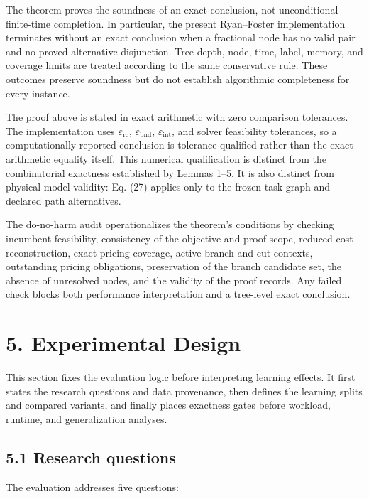 \documentclass[
  11pt,
]{article}
\begin{document}
The theorem proves the soundness of an exact conclusion, not
unconditional finite-time completion. In particular, the present
Ryan--Foster implementation terminates without an exact conclusion when
a fractional node has no valid pair and no proved alternative
disjunction. Tree-depth, node, time, label, memory, and coverage limits
are treated according to the same conservative rule. These outcomes
preserve soundness but do not establish algorithmic completeness for
every instance.

The proof above is stated in exact arithmetic with zero comparison
tolerances. The implementation uses \(\varepsilon_{\mathrm{rc}}\),
\(\varepsilon_{\mathrm{bnd}}\), \(\varepsilon_{\mathrm{int}}\), and
solver feasibility tolerances, so a computationally reported conclusion
is tolerance-qualified rather than the exact-arithmetic equality itself.
This numerical qualification is distinct from the combinatorial
exactness established by Lemmas 1--5. It is also distinct from
physical-model validity: Eq. (27) applies only to the frozen task graph
and declared path alternatives.

The do-no-harm audit operationalizes the theorem's conditions by
checking incumbent feasibility, consistency of the objective and proof
scope, reduced-cost reconstruction, exact-pricing coverage, active
branch and cut contexts, outstanding pricing obligations, preservation
of the branch candidate set, the absence of unresolved nodes, and the
validity of the proof records. Any failed check blocks both performance
interpretation and a tree-level exact conclusion.

\hypertarget{experimental-design}{%
\section{5. Experimental Design}\label{experimental-design}}

This section fixes the evaluation logic before interpreting learning
effects. It first states the research questions and data provenance,
then defines the learning splits and compared variants, and finally
places exactness gates before workload, runtime, and generalization
analyses.

\hypertarget{research-questions}{%
\subsection{5.1 Research questions}\label{research-questions}}

The evaluation addresses five questions:
\end{document}
